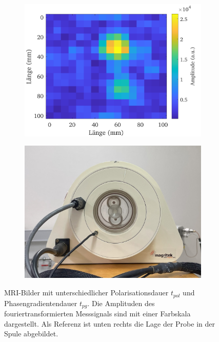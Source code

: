 \documentclass[../../main.tex]{subfiles}
\begin{document}
\begin{figure}[h!]
\begin{subfigure}[c]{0.5\textwidth}
                \label{fig:MRI_2D_YZ_500_100}
            \end{subfigure}
            \begin{subfigure}[c]{0.5\textwidth}
                \includegraphics[width=\linewidth]{Bilddateien/13/YZ-500-50/Fig_1}
                \label{fig:MRI_2D_YZ_500_50}
            \end{subfigure}
            \begin{subfigure}[c]{0.5\textwidth}
                \includegraphics[width=\linewidth]{Bilddateien/13/MRI_Phantom_crop.jpg}
                \label{fig:MRI_2D_Phantom}
            \end{subfigure}
            \caption{MRI-Bilder mit unterschiedlicher Polarisationsdauer $t_{pol}$ und Phasengradientendauer $t_{pg}$. Die Amplituden des fouriertransformierten Messsignals sind mit einer Farbskala dargestellt. Als Referenz ist unten rechts die Lage der Probe in der Spule abgebildet.}
            \label{fig:MRI_2D}
        \end{figure}
\end{document}
